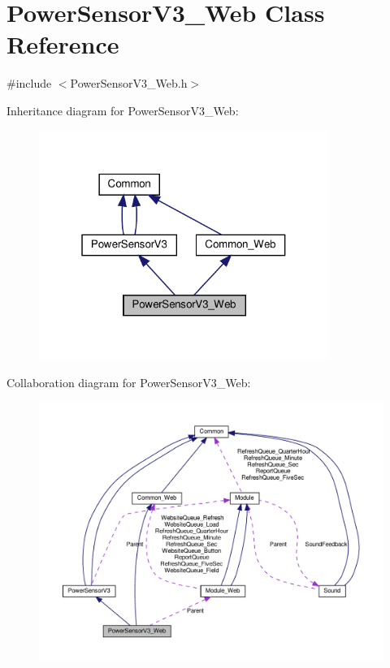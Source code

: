 \hypertarget{class_power_sensor_v3___web}{}\section{Power\+Sensor\+V3\+\_\+\+Web Class Reference}
\label{class_power_sensor_v3___web}


{\ttfamily \#include $<$Power\+Sensor\+V3\+\_\+\+Web.\+h$>$}



Inheritance diagram for Power\+Sensor\+V3\+\_\+\+Web\+:
\nopagebreak
\begin{figure}[H]
\begin{center}
\leavevmode
\includegraphics[width=268pt]{class_power_sensor_v3___web__inherit__graph}
\end{center}
\end{figure}


Collaboration diagram for Power\+Sensor\+V3\+\_\+\+Web\+:
\nopagebreak
\begin{figure}[H]
\begin{center}
\leavevmode
\includegraphics[width=350pt]{class_power_sensor_v3___web__coll__graph}
\end{center}
\end{figure}

